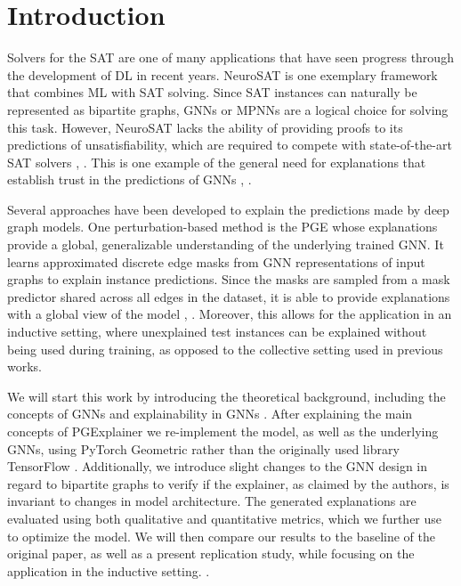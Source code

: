 \chapter{Introduction}
\label{ch:Introduction}

Solvers for the \ac{SAT} are one of many applications that have seen progress through the development of \ac{DL} in recent years. NeuroSAT \cite{selsam2018learning} is one exemplary framework that combines \ac{ML} with SAT solving. Since SAT instances can naturally be represented as bipartite graphs, \acp{GNN} or \acp{MPNN} are a logical choice for solving this task. However, NeuroSAT lacks the ability of providing proofs to its predictions of unsatisfiability, which are required to compete with state-of-the-art SAT solvers \cite{audemard2009predicting}, \cite{een2003extensible}. This is one example of the general need for explanations that establish trust in the predictions of GNNs \cite{guo2023machine}, \cite{ribeiro2016should}. \bigskip

Several approaches have been developed to explain the predictions made by deep graph models. One perturbation-based method is the \ac{PGE} \cite{luo2020parameterized} whose explanations provide a global, generalizable understanding of the underlying trained GNN. It learns approximated discrete edge masks from GNN representations of input graphs to explain instance predictions. Since the masks are sampled from a mask predictor shared across all edges in the dataset, it is able to provide explanations with a global view of the model \cite{luo2020parameterized}, \cite{yuan2022explainability}. Moreover, this allows for the application in an inductive setting, where unexplained test instances can be explained without being used during training, as opposed to the collective setting used in previous works.\bigskip

We will start this work by introducing the theoretical background, including the concepts of GNNs and explainability in GNNs \cite{yuan2022explainability}. After explaining the main concepts of PGExplainer \cite{luo2020parameterized} we re-implement the model, as well as the underlying GNNs, using PyTorch Geometric \cite{Fey/Lenssen/2019} rather than the originally used library TensorFlow \cite{tensorflow2015-whitepaper}. Additionally, we introduce slight changes to the GNN design in regard to bipartite graphs to verify if the explainer, as claimed by the authors, is invariant to changes in model architecture. The generated explanations are evaluated using both qualitative and quantitative metrics, which we further use to optimize the model. We will then compare our results to the baseline of the original paper, as well as a present replication study, while focusing on the application in the inductive setting. \cite{holdijk2021re}. \bigskip

